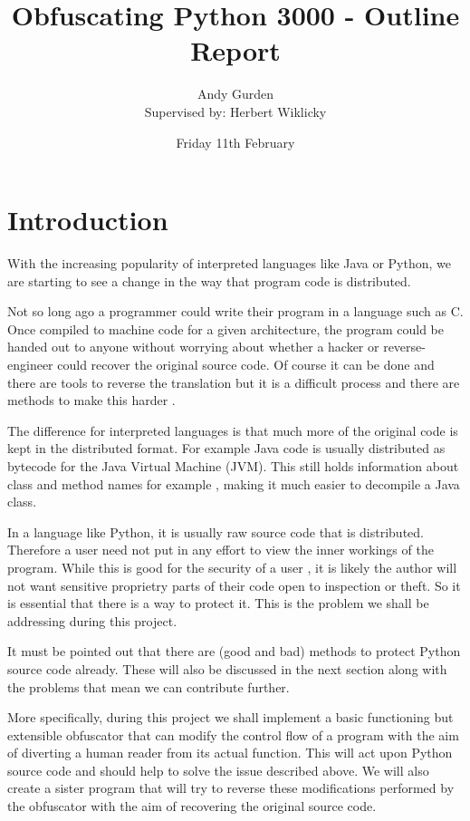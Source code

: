 \documentclass{report}
\title{Obfuscating Python 3000 - Outline Report}
\author{Andy Gurden\\Supervised by: Herbert Wiklicky}
\date{Friday 11th February}
\begin{document}
\maketitle

\section{Introduction}

With the increasing popularity of interpreted languages like Java or Python, we are starting
to see a change in the way that program code is distributed.

Not so long ago a programmer could write their program in a language such as C. Once compiled
to machine code for a given architecture, the program could be handed out to anyone without
worrying about whether a hacker or reverse-engineer could recover the original source code.
Of course it can be done and there are tools to reverse the translation \cite{cdecomp} but it
is a difficult process and there are methods to make this harder \cite{disres}.

The difference for interpreted languages is that much more of the original code is kept in the
distributed format. For example Java code is usually distributed as bytecode for the Java Virtual
Machine (JVM). This still holds information about class and method names for example \cite{classinfo},
making it much easier to decompile a Java class.

In a language like Python, it is usually raw source code that is distributed. Therefore a
user need not put in any effort to view the inner workings of the program. While this is good
for the security of a user \cite{noobf}, it is likely the author will not want sensitive
proprietry parts of their code open to inspection or theft. So it is essential that there is a
way to protect it. This is the problem we shall be addressing during this project.

It must be pointed out that there are (good and bad) methods to protect Python source code
already. These will also be discussed in the next section along with the problems that mean 
we can contribute further.

More specifically, during this project we shall implement a basic functioning but extensible obfuscator
that can modify the control flow of a program with the aim of diverting a human reader from its actual
function. This will act upon Python source code and should help to solve the issue described above.
We will also create a sister program that will try to reverse these modifications performed by the
obfuscator with the aim of recovering the original source code.
\end{document}
